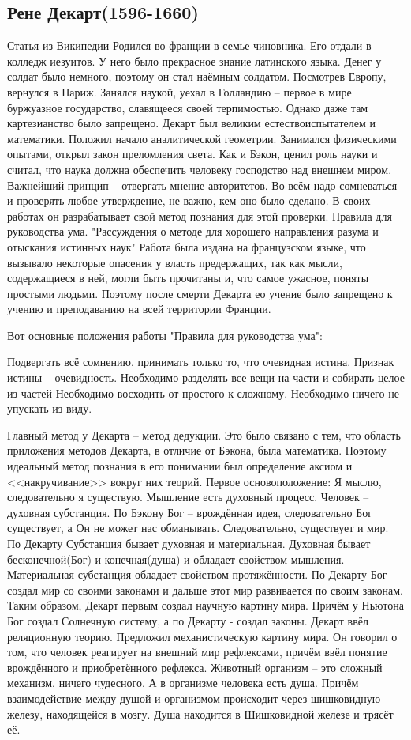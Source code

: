 \subsection{Рене Декарт(1596-1660)}

Статья из Википедии Родился во франции в семье чиновника. Его отдали в колледж иезуитов. У него было прекрасное знание латинского языка. Денег у солдат было немного, поэтому он стал наёмным солдатом. Посмотрев Европу, вернулся в Париж. Занялся наукой, уехал в Голландию – первое в мире буржуазное государство, славящееся своей терпимостью. Однако даже там картезианство было запрещено. Декарт был великим естествоиспытателем и математики. Положил начало аналитической геометрии. Занимался физическими опытами, открыл закон преломления света. Как и Бэкон, ценил роль науки и считал, что наука должна обеспечить человеку господство над внешнем миром. Важнейший принцип – отвергать мнение авторитетов. Во всём надо сомневаться и проверять любое утверждение, не важно, кем оно было сделано. В своих работах он разрабатывает свой метод познания для этой проверки. Правила для руководства ума. "Рассуждения о методе для хорошего направления разума и отыскания истинных наук" Работа была издана на французском языке, что вызывало некоторые опасения у власть предержащих, так как мысли, содержащиеся в ней, могли быть прочитаны и, что самое ужасное, поняты простыми людьми. Поэтому после смерти Декарта ео учение было запрещено к учению и преподаванию на всей территории Франции.

Вот основные положения работы "Правила для руководства ума":

    Подвергать всё сомнению, принимать только то, что очевидная истина. Признак истины – очевидность.
    Необходимо разделять все вещи на части и собирать целое из частей
    Необходимо восходить от простого к сложному.
    Необходимо ничего не упускать из виду.

Главный метод у Декарта – метод дедукции. Это было связано с тем, что область приложения методов Декарта, в отличие от Бэкона, была математика. Поэтому идеальный метод познания в его понимании был определение аксиом и <<накручивание>> вокруг них теорий. Первое основоположение: Я мыслю, следовательно я существую. Мышление есть духовный процесс. Человек – духовная субстанция. По Бэкону Бог – врождённая идея, следовательно Бог существует, а Он не может нас обманывать. Следовательно, существует и мир. По Декарту Субстанция бывает духовная и материальная. Духовная бывает бесконечной(Бог) и конечная(душа) и обладает свойством мышления. Материальная субстанция обладает свойством протяжённости. По Декарту Бог создал мир со своими законами и дальше этот мир развивается по своим законам. Таким образом, Декарт первым создал научную картину мира. Причём у Ньютона Бог создал Солнечную систему, а по Декарту - создал законы. Декарт ввёл реляционную теорию. Предложил механистическую картину мира. Он говорил о том, что человек реагирует на внешний мир рефлексами, причём ввёл понятие врождённого и приобретённого рефлекса. Животный организм – это сложный механизм, ничего чудесного. А в организме человека есть душа. Причём взаимодействие между душой и организмом происходит через шишковидную железу, находящейся в мозгу. Душа находится в Шишковидной железе и трясёт её.